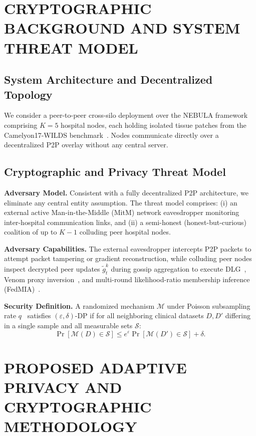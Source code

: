 \documentclass{ieeeaccess}
\begin{document}
\section{CRYPTOGRAPHIC BACKGROUND AND SYSTEM THREAT MODEL}

\subsection{System Architecture and Decentralized Topology}
We consider a peer-to-peer cross-silo deployment over the NEBULA framework~\cite{ref1} comprising $K = 5$ hospital nodes, each holding isolated tissue patches from the Camelyon17-WILDS benchmark~\cite{ref7,ref8}. Nodes communicate directly over a decentralized P2P overlay without any central server.

\subsection{Cryptographic and Privacy Threat Model}
\textbf{Adversary Model.} Consistent with a fully decentralized P2P architecture, we eliminate any central entity assumption. The threat model comprises: (i) an external active Man-in-the-Middle (MitM) network eavesdropper monitoring inter-hospital communication links, and (ii) a semi-honest (honest-but-curious) coalition of up to $K - 1$ colluding peer hospital nodes.

\textbf{Adversary Capabilities.} The external eavesdropper intercepts P2P packets to attempt packet tampering or gradient reconstruction, while colluding peer nodes inspect decrypted peer updates $\tilde{g}_t^k$ during gossip aggregation to execute DLG~\cite{ref2}, Venom proxy inversion~\cite{ref3}, and multi-round likelihood-ratio membership inference (FedMIA)~\cite{ref4}.

\textbf{Security Definition.} A randomized mechanism $\mathcal{M}$ under Poisson subsampling rate $q$~\cite{ref18} satisfies $(\varepsilon, \delta)$-DP if for all neighboring clinical datasets $D, D'$ differing in a single sample and all measurable sets $\mathcal{S}$:
\begin{equation}
\Pr[\mathcal{M}(D) \in \mathcal{S}] \le e^{\varepsilon} \Pr[\mathcal{M}(D') \in \mathcal{S}] + \delta.
\label{eq:dp_def}
\end{equation}

\section{PROPOSED ADAPTIVE PRIVACY AND CRYPTOGRAPHIC METHODOLOGY}
\end{document}

